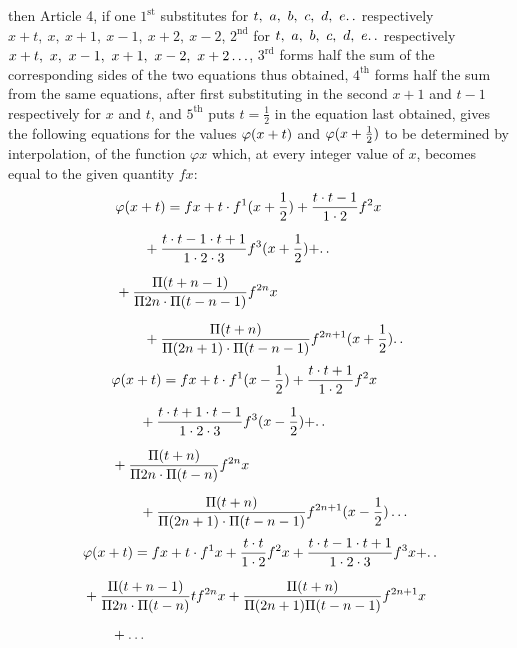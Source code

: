 then Article 4, if one $1^{\mathrm{st}}$ substitutes for $t,\allowbreak{}\ a,\allowbreak{}\ b,\allowbreak{}\ c,\allowbreak{}\ d,\allowbreak{}\ e\ldotp\ldotp$
respectively $x+t,\allowbreak{}\ x,\allowbreak{}\ x+1,\allowbreak{}\ x-1,\allowbreak{}\ x+2,\allowbreak{}\ x-2$, $2^{\mathrm{nd}}$ for
$t,\allowbreak{}\ a,\allowbreak{}\ b,\allowbreak{}\ c,\allowbreak{}\ d,\allowbreak{}\ e\ldotp\ldotp$ respectively $x+t,\allowbreak{}\ x,\allowbreak{}\ x-1,\allowbreak{}\ x+1,\allowbreak{}\ x-2,\allowbreak{}\ x+2\mathinner{.\,\allowbreak{}.\,\allowbreak{}.}$,
$3^{\mathrm{rd}}$ forms half the sum of the corresponding sides of the two equations thus obtained,
$4^{\mathrm{th}}$ forms half the sum from the same equations, after first substituting in the second $x+1$ and $t-1$ respectively for $x$ and $t$,
and $5^{\mathrm{th}}$ puts $t=\tfrac12$ in the equation last obtained, gives
the following equations for the values $\varphi(x+\nobreak{}t)$ and
$\varphi(x+\nobreak{}\tfrac12)$ to be determined by interpolation, of the function $\varphi x$ which, at every integer value
of $x$, becomes equal to the given quantity $fx$:
\[
\begin{aligned}
&\varphi(x+t)={}fx+t\cdot f^{1}(x+\frac12)+\frac{t\cdot t-1}{1\cdot2}f^{2}x
\\[6pt]
&\qquad{}+\frac{t\cdot t-1\cdot t+1}{1\cdot2\cdot3}f^{3}(x+\frac12)+\ldotp\ldotp\\[6pt]
&+\frac{\Pi(t+n-1)}{\Pi 2n\cdot\Pi(t-n-1)}f^{2n}x
\\[6pt]
&\qquad{}+\frac{\Pi(t+n)}{\Pi(2n+1)\cdot\Pi(t-n-1)}f^{2n+1}(x+\frac12)\ldotp\ldotp
\end{aligned}
\]
\[
\begin{aligned}
&\varphi(x+t)={}fx+t\cdot f^{1}(x-\frac12)+\frac{t\cdot t+1}{1\cdot2}f^{2}x
\\[6pt]
&\qquad{}+\frac{t\cdot t+1\cdot t-1}{1\cdot2\cdot3}f^{3}(x-\frac12)+\ldotp\ldotp\\[6pt]
&+\frac{\Pi(t+n)}{\Pi 2n\cdot\Pi(t-n)}f^{2n}x
\\[6pt]
&\qquad{}+\frac{\Pi(t+n)}{\Pi(2n+1)\cdot\Pi(t-n-1)}f^{2n+1}(x-\frac12)\mathinner{.\,.\,.}
\end{aligned}
\]
\[
\begin{aligned}
&\varphi(x+t)={}fx+t\cdot f^{1}x+\frac{t\cdot t}{1\cdot2}f^{2}x
+\frac{t\cdot t-1\cdot t+1}{1\cdot2\cdot3}f^{3}x+\ldotp\ldotp\\[6pt]
&+\frac{\Pi(t+n-1)}{\Pi 2n\cdot\Pi(t-n)}t f^{2n}x
+\frac{\Pi(t+n)}{\Pi(2n+1)\Pi(t-n-1)}f^{2n+1}x\\[6pt]
&\qquad{}+\mathinner{.\,.\,.}
\end{aligned}
\]
